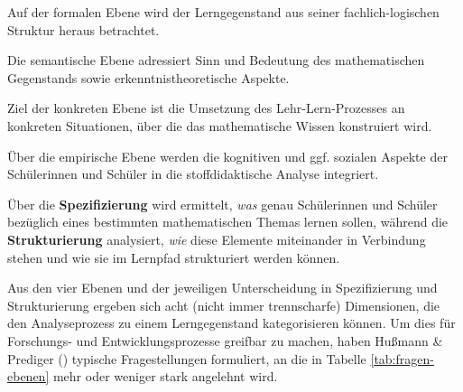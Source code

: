 \documentclass[
]{scrbook}
\theoremstyle{definition}
\theoremstyle{definition}
\theoremstyle{definition}
\theoremstyle{definition}
\theoremstyle{remark}
\begin{document}
Auf der \textcolor{formalColor}{formalen Ebene} wird der Lerngegenstand aus seiner fachlich-logischen Struktur heraus betrachtet.

Die \textcolor{semanticColor}{semantische Ebene} adressiert Sinn und Bedeutung des mathematischen Gegenstands sowie erkenntnistheoretische Aspekte.

Ziel der \textcolor{concreteColor}{konkreten Ebene} ist die Umsetzung des Lehr-Lern-Prozesses an konkreten Situationen, über die das mathematische Wissen konstruiert wird.

Über die \textcolor{empiricColor}{empirische Ebene} werden die kognitiven und ggf. sozialen Aspekte der Schülerinnen und Schüler in die stoffdidaktische Analyse integriert.

Über die \textbf{Spezifizierung} wird ermittelt, \emph{was} genau Schülerinnen und Schüler bezüglich eines bestimmten mathematischen Themas lernen sollen, während die \textbf{Strukturierung} analysiert, \emph{wie} diese Elemente miteinander in Verbindung stehen und wie sie im Lernpfad strukturiert werden können.

Aus den vier Ebenen und der jeweiligen Unterscheidung in Spezifizierung und Strukturierung ergeben sich acht (nicht immer trennscharfe) Dimensionen, die den Analyseprozess zu einem Lerngegenstand kategorisieren können. Um dies für Forschungs- und Entwicklungsprozesse greifbar zu machen, haben Hußmann \& Prediger () typische Fragestellungen formuliert, an die in Tabelle \ref{tab:fragen-ebenen} mehr oder weniger stark angelehnt wird.
\end{document}
